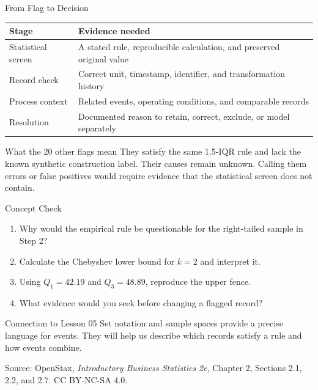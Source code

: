 \documentclass[aspectratio=169,10pt,english]{beamer}
\begin{document}
\begin{frame}{From Flag to Decision}
  \small
  \begin{center}
    \begin{tabular}{p{}p{}}
      \toprule
      \textbf{Stage} & \textbf{Evidence needed} \\
      \midrule
      Statistical screen & A stated rule, reproducible calculation, and preserved original value \\
      Record check & Correct unit, timestamp, identifier, and transformation history \\
      Process context & Related events, operating conditions, and comparable records \\
      Resolution & Documented reason to retain, correct, exclude, or model separately \\
      \bottomrule
    \end{tabular}
  \end{center}

  \vspace{0.8em}
  \begin{exampleblock}{What the 20 other flags mean}
    They satisfy the same 1.5-IQR rule and lack the known synthetic construction
    label. Their causes remain unknown. Calling them errors or false positives
    would require evidence that the statistical screen does not contain.
  \end{exampleblock}
\end{frame}

\begin{frame}{Concept Check}
  \begin{enumerate}
    \item Why would the empirical rule be questionable for the right-tailed
      sample in Step 2?
    \item Calculate the Chebyshev lower bound for $k=2$ and interpret it.
    \item Using $Q_1=42.19$ and $Q_3=48.89$, reproduce the upper fence.
    \item What evidence would you seek before changing a flagged record?
  \end{enumerate}

  \vspace{0.5em}
  \begin{block}{Connection to Lesson 05}
    Set notation and sample spaces provide a precise language for events. They
    will help us describe which records satisfy a rule and how events combine.
  \end{block}

  \vfill
  \scriptsize Source: OpenStax, \textit{Introductory Business Statistics 2e},
  Chapter 2, Sections 2.1, 2.2, and 2.7. CC BY-NC-SA 4.0.
\end{frame}

\appendix
\end{document}
